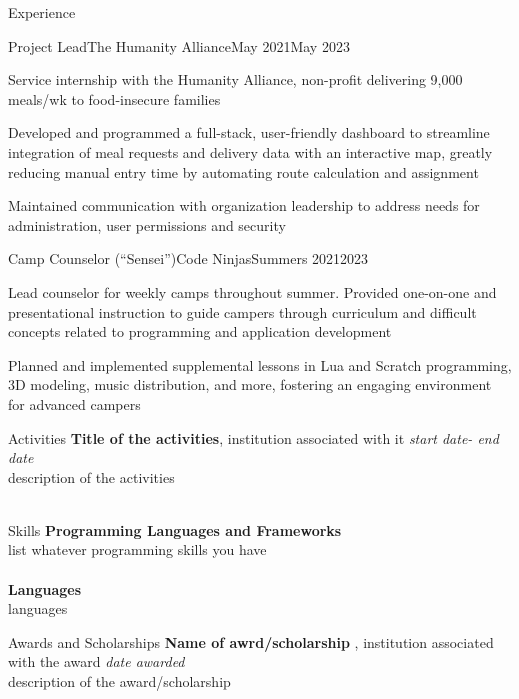\documentclass{resume} %
\begin{document}
\begin{rSection}{Experience}
  \begin{rItem}{Project Lead}{The Humanity Alliance}{May 2021}{May 2023}
    \item Service internship with the Humanity Alliance, non-profit delivering 9,000 meals/wk to food-insecure families
    \item Developed and programmed a full-stack, user-friendly dashboard to streamline integration of meal requests and delivery data with an interactive map, greatly reducing manual entry time by automating route calculation and assignment
    \item Maintained communication with organization leadership to address needs for  administration, user permissions and security
  \end{rItem}

  \begin{rItem}{Camp Counselor (``Sensei'')}{Code Ninjas}{Summers 2021}{2023}
    \item Lead counselor for weekly camps throughout summer. Provided one-on-one and presentational instruction to guide campers through curriculum and difficult concepts related to programming and application development
    \item Planned and implemented supplemental lessons in Lua and Scratch programming, 3D modeling, music distribution, and more, fostering an engaging environment for advanced campers
  \end{rItem}
\end{rSection}


\begin{rSection}{Activities}
  {\bf Title of the activities}{, institution associated with it} \hfill {\em start date- end date}\\
  description of the activities\\\\
\end{rSection}


\begin{rSection}{Skills}
  {\bf Programming Languages and Frameworks }
  \\list whatever programming skills you have\\\\
  {\bf Languages}
  \\languages
\end{rSection}



\begin{rSection}{Awards and Scholarships}
  {\bf Name of awrd/scholarship}{ , institution associated with the award
  } \hfill{\em date awarded}
  \\description of the award/scholarship\\

\end{rSection}
\end{document}
